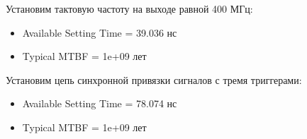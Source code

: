 \noindent Установим тактовую частоту на выходе  равной 400 МГц:
\begin{itemize}
	\item Available Setting Time = 39.036 нс
	\item Typical MTBF = 1e+09 лет
\end{itemize}

\noindent Установим цепь синхронной привязки сигналов с тремя триггерами:
\begin{itemize}
	\item Available Setting Time = 78.074 нс
	\item Typical MTBF = 1e+09 лет
\end{itemize}

%
%	
%	
%	
%	
%	
%	
%	
%	
%	
%	
%	


